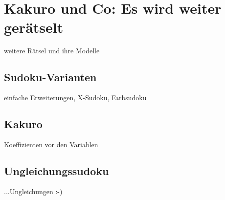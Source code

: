 \chapter{Kakuro und Co: Es wird weiter gerätselt}
\label{chap_andere}

weitere Rätsel und ihre Modelle

\section{Sudoku-Varianten}
einfache Erweiterungen, X-Sudoku, Farbsudoku

\section{Kakuro}
Koeffizienten vor den Variablen

\section{Ungleichungssudoku}
...Ungleichungen :-)


